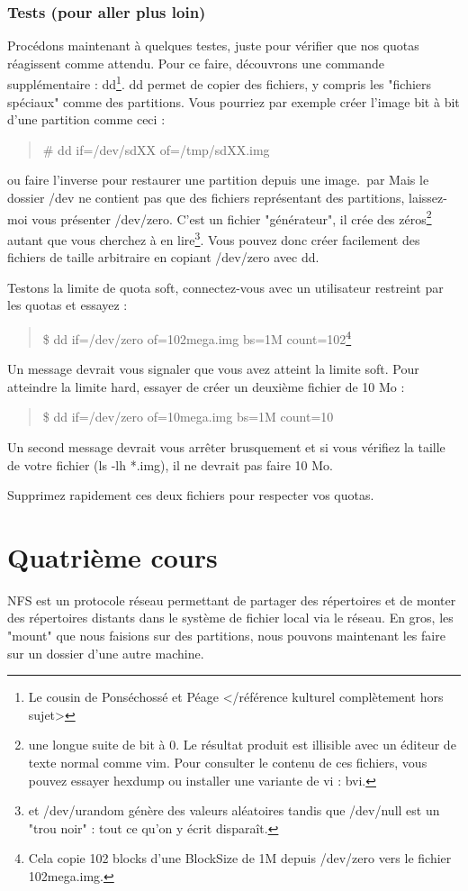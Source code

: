 \documentclass[a4paper,11pt]{article}
\newcommand{\commande}[1] {
    \begin{quote}
    \tt\raggedright #1
    \end{quote}
}
\begin{document}
\subsubsection{Tests (pour aller plus loin)}
\par Procédons maintenant à quelques testes, juste pour vérifier que nos quotas réagissent comme attendu. Pour ce faire, découvrons une commande supplémentaire : dd\footnote{Le cousin de Ponséchossé et Péage </référence kulturel complètement hors sujet>}. dd permet de copier des fichiers, y compris les "fichiers spéciaux" comme des partitions. Vous pourriez par exemple créer l'image bit à bit d'une partition comme ceci :
\commande{\# dd if=/dev/sdXX of=/tmp/sdXX.img}
ou faire l'inverse pour restaurer une partition depuis une image.
\,par Mais le dossier /dev ne contient pas que des fichiers représentant des partitions, laissez-moi vous présenter /dev/zero. C'est un fichier "générateur", il crée des zéros\footnote{une longue suite de bit à 0. Le résultat produit est illisible avec un éditeur de texte normal comme vim. Pour consulter le contenu de ces fichiers, vous pouvez essayer hexdump ou installer une variante de vi : bvi.} autant que vous cherchez à en lire\footnote{et /dev/urandom génère des valeurs aléatoires tandis que /dev/null est un "trou noir" : tout ce qu'on y écrit disparaît.}. Vous pouvez donc créer facilement des fichiers de taille arbitraire en copiant /dev/zero avec dd.
\par Testons la limite de quota soft, connectez-vous avec un utilisateur restreint par les quotas et essayez :
\commande{\$ dd if=/dev/zero of=102mega.img bs=1M count=102\footnote{Cela copie 102 blocks d'une BlockSize de 1M depuis /dev/zero vers le fichier 102mega.img.}}
Un message devrait vous signaler que vous avez atteint la limite soft. Pour atteindre la limite hard, essayer de créer un deuxième fichier de 10 Mo :
\commande{\$ dd if=/dev/zero of=10mega.img bs=1M count=10}
Un second message devrait vous arrêter brusquement et si vous vérifiez la taille de votre fichier (ls -lh *.img), il ne devrait pas faire 10 Mo.
\par Supprimez rapidement ces deux fichiers pour respecter vos quotas.
\section{Quatrième cours}
\par NFS est un protocole réseau permettant de partager des répertoires et de monter des répertoires distants dans le système de fichier local via le réseau. En gros, les "mount" que nous faisions sur des partitions, nous pouvons maintenant les faire sur un dossier d'une autre machine.
\end{document}
